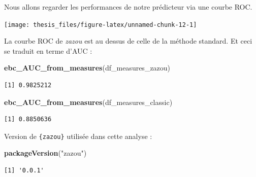 \documentclass[12pt,a4paper]{reedthesis}
\newenvironment{Shaded}{\begin{snugshade}}{\end{snugshade}}
\newcommand{\DataTypeTok}[1]{\textcolor[rgb]{0.13,0.29,0.53}{#1}}
\newcommand{\KeywordTok}[1]{\textcolor[rgb]{0.13,0.29,0.53}{\textbf{#1}}}
\newcommand{\NormalTok}[1]{#1}
\newcommand{\OperatorTok}[1]{\textcolor[rgb]{0.81,0.36,0.00}{\textbf{#1}}}
\newcommand{\StringTok}[1]{\textcolor[rgb]{0.31,0.60,0.02}{#1}}
\theoremstyle{definition}
\theoremstyle{definition}
\theoremstyle{definition}
\theoremstyle{remark}
\begin{document}
Nous allons regarder les performances de notre prédicteur via une courbe ROC.
\begin{Shaded}
\end{Shaded}
\begin{center}\texttt{[image: thesis\_files/figure-latex/unnamed-chunk-12-1]} \end{center}

La courbe ROC de \emph{zazou} est au dessus de celle de la méthode standard. Et ceci se traduit en terme d'AUC :
\begin{Shaded}
\begin{Highlighting}[]
\KeywordTok{ebc_AUC_from_measures}\NormalTok{(df_measures_zazou)}
\end{Highlighting}
\end{Shaded}
\begin{verbatim}
[1] 0.9825212
\end{verbatim}
\begin{Shaded}
\begin{Highlighting}[]
\KeywordTok{ebc_AUC_from_measures}\NormalTok{(df_measures_classic)}
\end{Highlighting}
\end{Shaded}
\begin{verbatim}
[1] 0.8850636
\end{verbatim}
Version de \texttt{\{zazou\}} utilisée dans cette analyse :
\begin{Shaded}
\begin{Highlighting}[]
\KeywordTok{packageVersion}\NormalTok{(}\StringTok{"zazou"}\NormalTok{)}
\end{Highlighting}
\end{Shaded}
\begin{verbatim}
[1] '0.0.1'
\end{verbatim}
\backmatter
\end{document}
